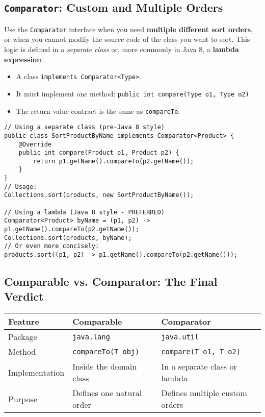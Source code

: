 \documentclass[12pt]{article}
\begin{document}
\begin{enumerate}[label=(\arabic*)]
\subsection{\texttt{Comparator}: Custom and Multiple Orders}
Use the \texttt{Comparator} interface when you need \textbf{multiple different sort orders}, or when you cannot modify the source code of the class you want to sort. This logic is defined in a \textit{separate class} or, more commonly in Java 8, a \textbf{lambda expression}.
\begin{itemize}
    \item A class \texttt{implements Comparator<Type>}.
    \item It must implement one method: \texttt{public int compare(Type o1, Type o2)}.
    \item The return value contract is the same as \texttt{compareTo}.
\end{itemize}
\begin{verbatim}
// Using a separate class (pre-Java 8 style)
public class SortProductByName implements Comparator<Product> {
    @Override
    public int compare(Product p1, Product p2) {
        return p1.getName().compareTo(p2.getName());
    }
}
// Usage:
Collections.sort(products, new SortProductByName());

// Using a lambda (Java 8 style - PREFERRED)
Comparator<Product> byName = (p1, p2) -> p1.getName().compareTo(p2.getName());
Collections.sort(products, byName);
// Or even more concisely:
products.sort((p1, p2) -> p1.getName().compareTo(p2.getName()));
\end{verbatim}

\subsection*{Comparable vs. Comparator: The Final Verdict}
\begin{tabular}{|l|l|l|}
\hline
\textbf{Feature} & \textbf{Comparable} & \textbf{Comparator} \\
\hline
Package & \texttt{java.lang} & \texttt{java.util} \\
\hline
Method & \texttt{compareTo(T obj)} & \texttt{compare(T o1, T o2)} \\
\hline
Implementation & Inside the domain class & In a separate class or lambda \\
\hline
Purpose & Defines one natural order & Defines multiple custom orders \\
\hline
\end{tabular}


\end{enumerate}
\end{document}
